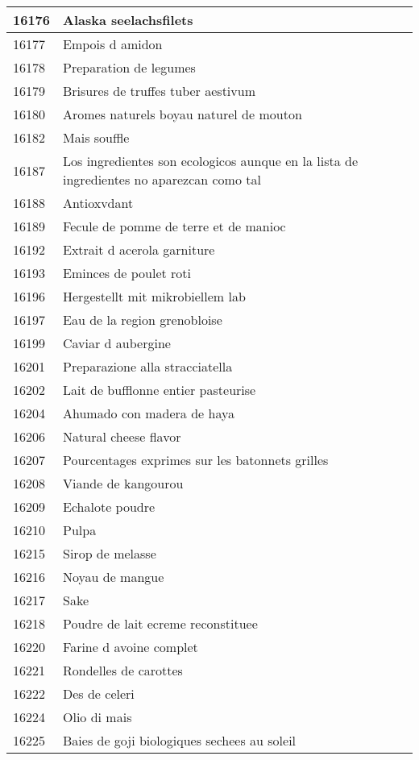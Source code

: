 \begin{longtable}{|l|l|}
16176 & Alaska seelachsfilets \\ \hline 
16177 & Empois d amidon \\ \hline 
16178 & Preparation de legumes \\ \hline 
16179 & Brisures de truffes tuber aestivum \\ \hline 
16180 & Aromes naturels boyau naturel de mouton \\ \hline 
16182 & Mais souffle \\ \hline 
16187 & Los ingredientes son ecologicos aunque en la lista de ingredientes no aparezcan como tal \\ \hline 
16188 & Antioxvdant \\ \hline 
16189 & Fecule de pomme de terre et de manioc \\ \hline 
16192 & Extrait d acerola garniture \\ \hline 
16193 & Eminces de poulet roti \\ \hline 
16196 & Hergestellt mit mikrobiellem lab \\ \hline 
16197 & Eau de la region grenobloise \\ \hline 
16199 & Caviar d aubergine \\ \hline 
16201 & Preparazione alla stracciatella \\ \hline 
16202 & Lait de bufflonne entier pasteurise \\ \hline 
16204 & Ahumado con madera de haya \\ \hline 
16206 & Natural cheese flavor \\ \hline 
16207 & Pourcentages exprimes sur les batonnets grilles \\ \hline 
16208 & Viande de kangourou \\ \hline 
16209 & Echalote poudre \\ \hline 
16210 & Pulpa \\ \hline 
16215 & Sirop de melasse \\ \hline 
16216 & Noyau de mangue \\ \hline 
16217 & Sake \\ \hline 
16218 & Poudre de lait ecreme reconstituee \\ \hline 
16220 & Farine d avoine complet \\ \hline 
16221 & Rondelles de carottes \\ \hline 
16222 & Des de celeri \\ \hline 
16224 & Olio di mais \\ \hline 
16225 & Baies de goji biologiques sechees au soleil \\ \hline 

\end{longtable}
